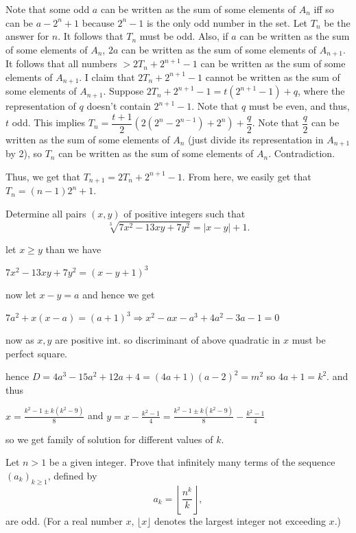 \documentclass{subfile}
\begin{document}
	\begin{solution}
		Note that some odd $a$ can be written as the sum of some elements of $A_n$ iff so can be $a-2^n+1$ because $2^n-1$ is the only odd number in the set. Let $T_n$ be the answer for $n$. It follows that $T_n$ must be odd. Also, if $a$ can be written as the sum of some elements of $A_n$, $2a$ can be written as the sum of some elements of $A_{n+1}$. It follows that all numbers $ > 2T_n + 2^{n+1}-1$ can be written as the sum of some elements of $A_{n+1}$. I claim that $2T_n + 2^{n+1}-1$ cannot be written as the sum of some elements of $A_{n+1}$. Suppose $2T_n + 2^{n+1} - 1 = t (2^{n+1}-1) + q$, where the representation of $q$ doesn't contain $2^{n+1}-1$. Note that $q$ must be even, and thus, $t$ odd. This implies $T_n = \dfrac{t+1}{2} (2 (2^n - 2^{n-1}) + 2^n) + \dfrac{q}{2}$. Note that $\dfrac{q}{2}$ can be written as the sum of some elements of $A_n$ (just divide its representation in $A_{n+1}$ by 2), so $T_n$ can be written as the sum of some elements of $A_n$. Contradiction.
		
		Thus, we get that $T_{n+1}= 2 T_n + 2^{n+1}-1$. From here, we easily get that $T_n= (n-1)2^n+1$.
		
	\end{solution}
	
	
	\begin{problem}
		Determine all pairs $(x, y)$ of positive integers such that \[\sqrt[3]{7x^2-13xy+7y^2}=|x-y|+1.\]
	\end{problem}
	
	\begin{solution}
		let $x\ge y$ than we have
		
		$7x^2-13xy+7y^2=(x-y+1)^3$
		
		now let $x-y=a$ and hence we get
		
		$7a^2+x(x-a)=(a+1)^3\Longrightarrow x^2-ax-a^3+4a^2-3a-1=0$
		
		now as $x,y$ are positive int. so discriminant of above quadratic in $x$ must be perfect square.
		
		hence $D=4a^3-15a^2+12a+4=(4a+1)(a-2)^2=m^2$ so $4a+1=k^2$. and thus
		
		$x=\frac{k^2-1\pm k(k^2-9)}{8}$ and $y=x-\frac{k^2-1}{4} = \frac{k^2-1\pm k(k^2-9)}{8} - \frac{k^2-1}{4}$
		
		so we get family of solution for different values of $k$.
		
	\end{solution}
	
	\begin{problem} Let $n > 1$ be a given integer. Prove that infinitely many terms of the sequence $(a_k )_{k\ge 1}$, defined by \[a_k=\left\lfloor\frac{n^k}{k}\right\rfloor,\] are odd. (For a real number $x$, $\lfloor x\rfloor$ denotes the largest integer not exceeding $x$.)
	\end{problem}
	
\end{document}
